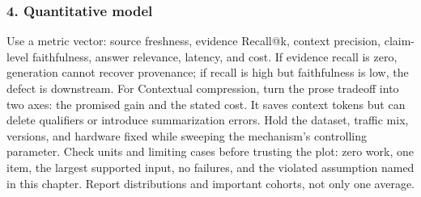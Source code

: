 \subsubsection*{4. Quantitative model}
Use a metric vector: source freshness, evidence Recall@k, context precision, claim-level faithfulness, answer relevance, latency, and cost. If evidence recall is zero, generation cannot recover provenance; if recall is high but faithfulness is low, the defect is downstream.
For Contextual compression, turn the prose tradeoff into two axes: the promised gain and the stated cost. It saves context tokens but can delete qualifiers or introduce summarization errors. Hold the dataset, traffic mix, versions, and hardware fixed while sweeping the mechanism's controlling parameter.
Check units and limiting cases before trusting the plot: zero work, one item, the largest supported input, no failures, and the violated assumption named in this chapter. Report distributions and important cohorts, not only one average.
